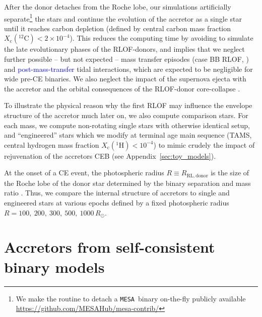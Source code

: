 \documentclass[twocolumn,twocolappendix,trackchanges]{aastex63}
\newcommand{\code}[1]{\texttt{#1}}
\newcommand{\mesa}{\code{MESA}}
\begin{document}
After the donor detaches from the Roche lobe, our simulations
artificially separate\footnote{We make the routine to detach a \mesa\
  binary on-the-fly publicly available
  \url{https://github.com/MESAHub/mesa-contrib/}} the stars and
continue the evolution of the accretor as a single star until it
reaches carbon depletion (defined by central carbon mass fraction
$X_\mathrm{c}(^{12}\mathrm{C})<2\times10^{-4} $). This reduces the
computing time by avoiding to simulate the late evolutionary phases of
the RLOF-donors, and implies that we neglect further possible -- but
not expected -- mass transfer episodes (case BB RLOF,
\citealt{delgado:81, laplace:2020}) and \textcolor{blue}{post-mass-transfer}
tidal interactions, which are expected to be
negligible for wide pre-CE binaries. We also neglect the impact of the
supernova ejecta with the accretor \cite[which has a small and
short-lasting effect only on the outermost layers,
e.g.,][]{hirai:2018, ogata:2021} and the orbital consequences of the
RLOF-donor core-collapse \citep[e.g.,][]{brandt:1995, kalogera:1996,
  tauris:1998, renzo:2019walk}.

To illustrate the physical reason why the first RLOF may influence the
envelope structure of the accretor much later on, we also compute
comparison stars. For each mass, we compute non-rotating single stars
with otherwise identical setup, and ``engineered'' stars which we
modify at terminal age main sequence (TAMS, central hydrogen mass
fraction $X_\mathrm{c}(^1\mathrm{H})<10^{-4}$) to mimic crudely the
impact of rejuvenation of the accretors CEB (see
Appendix~\ref{sec:toy_models}).

At the onset of a CE event, the photospheric radius
$R\equiv R_\mathrm{RL, donor}$ is the size of the Roche lobe of the
donor star determined by the binary separation and mass ratio
\citep[e.g.,][]{paczynski:1971, eggleton:83}. Thus, we compare the
internal structure of accretors to single and engineered stars at
various epochs defined by a fixed photospheric radius
$R=100,\ 200,\ 300,\ 500,\ 1000\,R_\odot$.

\section{Accretors from self-consistent binary models}
\label{sec:bin_models}
\end{document}
